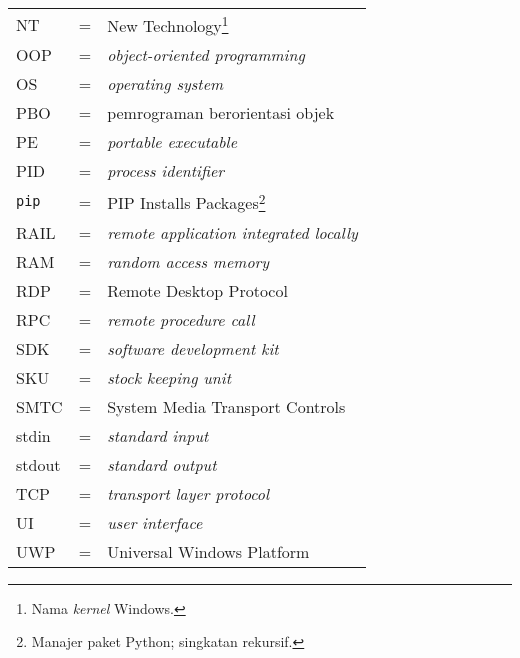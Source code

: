 \begin{longtable}{llp{3in}}
    NT & \hspace{1.5cm} = & New Technology\footnote{Nama \textit{kernel} Windows.}\\
    OOP & \hspace{1.5cm} = & \textit{object-oriented programming}\\
    OS & \hspace{1.5cm} = & \textit{operating system}\\
    PBO & \hspace{1.5cm} = & pemrograman berorientasi objek\\
    PE & \hspace{1.5cm} = & \textit{portable executable}\\
    PID & \hspace{1.5cm} = & \textit{process identifier}\\
    \verb|pip| & \hspace{1.5cm} = & PIP Installs Packages\footnote{Manajer paket Python; singkatan rekursif.}\\
    RAIL & \hspace{1.5cm} = & \textit{remote application integrated locally}\\
    RAM & \hspace{1.5cm} = & \textit{random access memory}\\
    RDP & \hspace{1.5cm} = & Remote Desktop Protocol\\
    RPC & \hspace{1.5cm} = & \textit{remote procedure call}\\
    SDK & \hspace{1.5cm} = & \textit{software development kit}\\
    SKU & \hspace{1.5cm} = & \textit{stock keeping unit}\\
    SMTC & \hspace {1.5cm} = & System Media Transport Controls\\
    stdin & \hspace{1.5cm} = & \textit{standard input}\\
    stdout & \hspace{1.5cm} = & \textit{standard output}\\
    TCP & \hspace{1.5cm} = & \textit{transport layer protocol}\\
    UI & \hspace{1.5cm} = & \textit{user interface}\\
    UWP & \hspace{1.5cm} = & Universal Windows Platform\\

\end{longtable}
